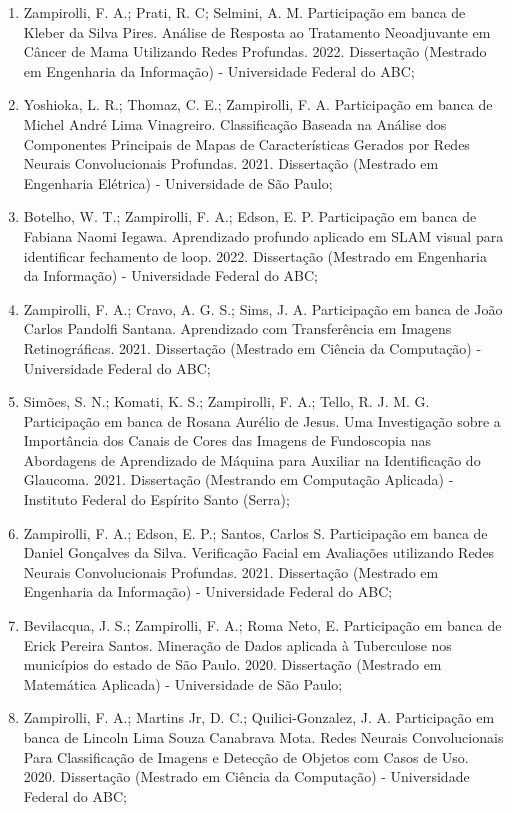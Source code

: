\begin{enumerate}
    \item Zampirolli, F. A.; Prati, R. C; Selmini, A. M. Participação em banca de Kleber da Silva Pires. Análise de Resposta ao Tratamento Neoadjuvante em Câncer de Mama Utilizando Redes Profundas. 2022. Dissertação (Mestrado em Engenharia da Informação) - Universidade Federal do ABC; 
    \item Yoshioka, L. R.; Thomaz, C. E.; Zampirolli, F. A. Participação em banca de Michel André Lima Vinagreiro. Classificação Baseada na Análise dos Componentes Principais de Mapas de Características Gerados por Redes Neurais Convolucionais Profundas. 2021. Dissertação (Mestrado em Engenharia Elétrica) - Universidade de São Paulo;
    \item Botelho, W. T.; Zampirolli, F. A.; Edson, E. P. Participação em banca de Fabiana Naomi Iegawa. Aprendizado profundo aplicado em SLAM visual para identificar fechamento de loop. 2022. Dissertação (Mestrado em Engenharia da Informação) - Universidade Federal do ABC; 
    \item Zampirolli, F. A.; Cravo, A. G. S.; Sims, J. A. Participação em banca de João Carlos Pandolfi Santana. Aprendizado com Transferência em Imagens Retinográficas. 2021. Dissertação (Mestrado em Ciência da Computação) - Universidade Federal do ABC;
    \item Simões, S. N.; Komati, K. S.; Zampirolli, F. A.; Tello, R. J. M. G. Participação em banca de Rosana Aurélio de Jesus. Uma Investigação sobre a Importância dos Canais de Cores das Imagens de Fundoscopia nas Abordagens de Aprendizado de Máquina para Auxiliar na Identificação do Glaucoma. 2021. Dissertação (Mestrando em Computação Aplicada) - Instituto Federal do Espírito Santo (Serra);
    \item Zampirolli, F. A.; Edson, E. P.; Santos, Carlos S. Participação em banca de Daniel Gonçalves da Silva. Verificação Facial em Avaliações utilizando Redes Neurais Convolucionais Profundas. 2021. Dissertação (Mestrado em Engenharia da Informação) - Universidade Federal do ABC;
    \item Bevilacqua, J. S.; Zampirolli, F. A.; Roma Neto, E. Participação em banca de Erick Pereira Santos. Mineração de Dados aplicada à Tuberculose nos municípios do estado de São Paulo. 2020. Dissertação (Mestrado em Matemática Aplicada) - Universidade de São Paulo;
    \item Zampirolli, F. A.; Martins Jr, D. C.; Quilici-Gonzalez, J. A. Participação em banca de Lincoln Lima Souza Canabrava Mota. Redes Neurais Convolucionais Para Classificação de Imagens e Detecção de Objetos com Casos de Uso. 2020. Dissertação (Mestrado em Ciência da Computação) - Universidade Federal do ABC;

\end{enumerate}
